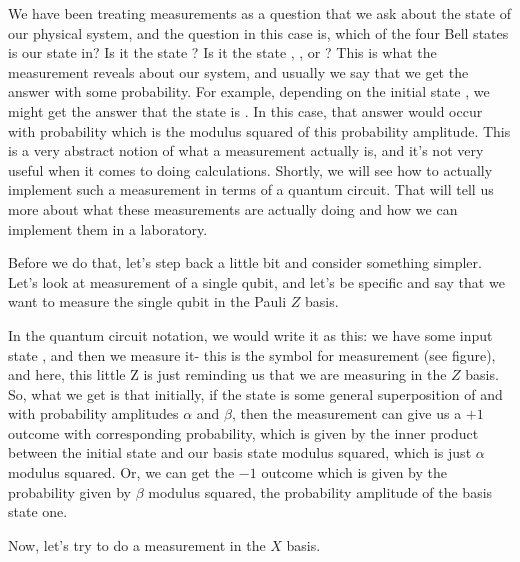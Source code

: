 We have been treating measurements as a question that we ask about the state of our physical system, and the question in this case is, which of the four Bell states is our state in? Is it the state \ket{\Phi^+}? Is it the state \ket{\Phi^-}, \ket{\Psi^+}, or \ket{\Psi^-}? This is what the measurement reveals about our system, and usually we say that we get the answer with some probability. For example, depending on the initial state \ket{\psi}, we might get the answer that the state is \ket{\Phi^+}. In this case, that answer would occur with probability which is the modulus squared of this probability amplitude. This is a very abstract notion of what a measurement actually is, and it's not very useful when it comes to doing calculations. Shortly, we will see how to actually implement such a measurement in terms of a quantum circuit. That will tell us more about what these measurements are actually doing and how we can implement them in a laboratory.

Before we do that, let's step back a little bit and consider something simpler. Let's look at measurement of a single qubit, and let's be specific and say that we want to measure the single qubit in the Pauli $Z$ basis.


In the quantum circuit notation, we would write it as this: we have some input state \ket{\psi}, and then we measure it- this is the symbol for measurement (see figure), and here, this little Z is just reminding us that we are measuring in the $Z$ basis.  So, what we get is that initially, if the state is some general superposition of  and  with probability amplitudes $\alpha$ and $\beta$, then the measurement can give us a $+1$ outcome with corresponding probability, which is given by the inner product between the initial state and our basis state  modulus squared, which is just $\alpha$ modulus squared. Or, we can get the  $-1$ outcome which is given by the probability given by $\beta$ modulus squared, the probability amplitude of the basis state one.

Now, let's try to do a measurement in the $X$ basis.

